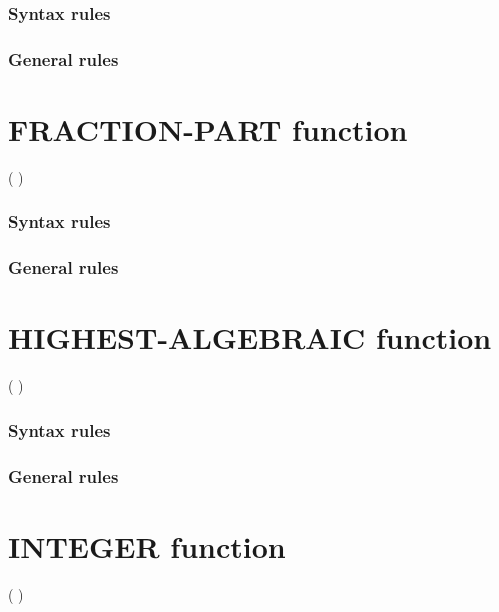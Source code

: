\subsubsection{Syntax rules}

\subsubsection{General rules}

\section{FRACTION-PART function}

\begin{syntax}
    ( \argument )
\end{syntax}

\subsubsection{Syntax rules}

\subsubsection{General rules}

\section{HIGHEST-ALGEBRAIC function}

\begin{syntax}
    ( \argument )
\end{syntax}

\subsubsection{Syntax rules}

\subsubsection{General rules}

\section{INTEGER function}

\begin{syntax}
    ( \argument )
\end{syntax}

